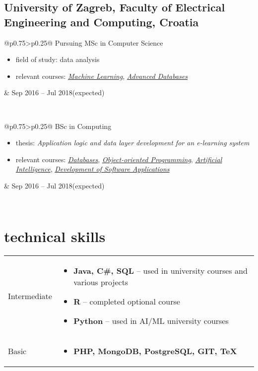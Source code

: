 \documentclass[a4paper]{article}
\makeatletter
\newlength{\tablewidth}
\newenvironment{period}[2]{%
\newcommand{\sarma}{#2}%
\setlength{\tablewidth}{\linewidth}
\addtolength{\tablewidth}{-2\tabcolsep}
\begin{tabular}{@{}p{0.75\tablewidth}>{\raggedleft\arraybackslash}p{0.25\tablewidth}@{}}%
#1 \newline
\begin{itemize}
}{%
\end{itemize} & \sarma \\%
\end{tabular}\\
}
\newenvironment{skills}{%
\setlength{\tablewidth}{\linewidth}
\addtolength{\tablewidth}{-2\tabcolsep}
\begin{tabular}{@{}p{0.15\tablewidth}p{0.85\tablewidth}@{}}
}{%
\end{tabular}
}
\makeatother
\begin{document}
\subsection{University of Zagreb, Faculty of Electrical Engineering and Computing, Croatia}
\begin{period}{Pursuing MSc in Computer Science}{Sep 2016 -- Jul 2018\linebreak(expected)}
    \item field of study:
        data analysis
    \item relevant courses:
	    \textit{\href{%
	    	}{Machine Learning}},
	    \textit{\href{%
	    	}{Advanced Databases}}
\end{period}
\begin{period}{BSc in Computing}{Sep 2013 -- Jul 2016}
    \item thesis:
        \textit{Application logic and data layer development for an e-learning system}
    \item relevant courses:
	    \textit{\href{%
	    		}{Databases}},
		\textit{\href{%
				}{Object-oriented Programming}},
		\textit{\href{%
				}{Artificial Intelligence}},
		\textit{\href{%
				}{Development of Software Applications}}
\end{period}

\section{technical skills}
\begin{skills}
    Intermediate &
    \begin{itemize}
        \item \textbf{Java, C\#, SQL} -- used in university courses and various projects
        \item \textbf{R} -- completed optional course
        \item \textbf{Python} -- used in AI/ML university courses    
    \end{itemize} \\
    Basic &
    \begin{itemize}
        \item \textbf{PHP, MongoDB, PostgreSQL, GIT, TeX}
    \end{itemize} \\
\end{skills}
\end{document}

